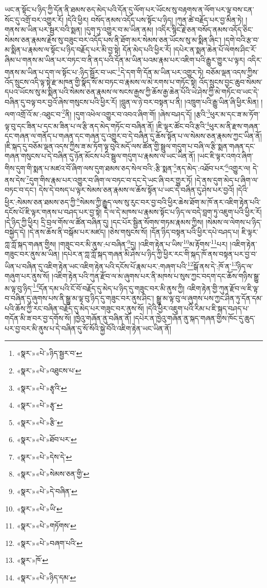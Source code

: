 ཡང་ན་སྟོང་པ་ཉིད་ཀྱི་དོན་ནི་ཐམས་ཅད་མེད་པའི་དོན་དུ་ལོག་པར་ཡོངས་སུ་བརྟགས་ན་ལོག་པར་ལྟ་བས་ངན་སོང་དུ་འགྲོ་བར་འགྱུར་རོ། །དེའི་ཕྱིར། བསོད་ནམས་འདོད་པས་སྟོང་པ་ཉིད། །ཀུན་ཚེ་བརྗོད་པར་བྱ་མིན་ཏེ། །གནས་མ་ཡིན་པར་སྦྱར་བའི་སྨན། །དུག་ཏུ་འགྱུར་བ་མ་ཡིན་ནམ། །འདིར་སྙིང་རྗེ་ཅན་བསོད་ནམས་འདོད་ཅིང་སེམས་ཅན་རྣམས་རྗེས་སུ་བཟུང་བར་འདོད་པས་ནི་ཐོག་མར་སེམས་ཅན་ཡོངས་སུ་མ་སྨིན་ཞིང་། །དགེ་བའི་རྩ་བ་མ་སྨིན་པ་རྣམས་ལ་སྟོང་པ་ཉིད་བརྗོད་པར་མི་བྱ་སྟེ། དོན་མེད་པའི་ཕྱིར་རོ། །དཔེར་ན་སྨན་ཆེན་པོ་ལེགས་ཤིང་རོ་ཞིམ་པ་གནས་མ་ཡིན་པར་བཏང་བ་ནི་ནད་པའི་དོན་མ་ཡིན་པའམ་རྣམ་པར་འཇིག་པའི་རྒྱུར་གྱུར་པ་ལྟར། འདིར་གནས་མ་ཡིན་པ་དག་ལ་སྟོང་པ་:ཉིད་སྦྱོར་བ་ཡང་\footnote{«སྣར་»«པེ་»ཉིད་སྦྱར་བ་}དེ་དག་གི་དོན་མ་ཡིན་པར་འགྱུར་ཏེ། བཅོམ་ལྡན་འདས་ཀྱིས་འོད་སྲུངས་འདི་ལྟ་སྟེ་རྫ་མཁན་གྱི་སྣོད་སོ་མ་བཏང་བ་རྣམས་ལ་མེ་རགས་པ་གཏོང་སྟེ། འོད་སྲུངས་བྱང་ཆུབ་སེམས་དཔའ་ཡོངས་སུ་མ་སྨིན་པའི་སེམས་ཅན་རྣམས་ལ་སངས་རྒྱས་ཀྱི་ཆོས་རྒྱ་ཆེན་པོའི་ཡེ་ཤེས་ཀྱི་མེ་གཏོང་བ་ཡང་དེ་བཞིན་དུ་བལྟ་བར་བྱའོ་ཞེས་གསུངས་པའི་ཕྱིར་རོ། །བླུན་ལ་ཉེ་བར་བསྟན་པ་ནི། །འཁྲུག་པའི་རྒྱུ་ཡིན་ཞི་ཕྱིར་མིན། །ལག་འགྲོ་འོ་མ་:འཐུང་བ་\footnote{«སྣར་»«པེ་»འཐུངས་པ་}ནི། །དུག་འཕེལ་འགྱུར་བ་འབའ་ཞིག་གོ། །ཞེས་བཤད་དོ། །རྩའི་\footnote{«སྣར་»«པེ་»རྩྭའི་}ཕུར་མ་དང་ཟ་མ་ཏོག་ལྟ་བུ་དང་ཟིན་པ་དང་མ་ཟིན་པ་ལ་རྩི་ནད་མེད་གཏོང་བ་བཞིན་ནོ། །ཇི་ལྟར་ཚོང་བའི་རྩའི་\footnote{«སྣར་»«པེ་»རྩྭ་}ཕུར་མ་ནི་རྫས་གཞན་དང་གཞན་ལ་གནོད་པ་གཞན་དང་གཞན་དུ་འགྱུར་བ་དེ་བཞིན་དུ་ཆོས་སྟོན་པ་ལ་སེམས་ཅན་རྣམས་ཀྱང་ཡིན་ནོ། །ཇི་སྐད་དུ་བཅོམ་ལྡན་འདས་ཀྱིས་ཟ་མ་ཏོག་ལྟ་བུའི་མདོ་ལས་ཚོན་གྱི་སྦྲུལ་གདུག་པ་བཞི་ལ་རྩི་སྨན་གཞན་དང་གཞན་གསུངས་པ་དེ་བཞིན་དུ་ཉོན་མོངས་པའི་སྦྲུལ་གདུག་པ་རྣམས་ལ་ཡང་ཡིན་ནོ། །ཡང་ཇི་ལྟར་འགའ་ཞིག་གིས་དུག་གི་སྨན་པ་མཛའ་བོ་ཞིག་ལས་དུག་ཐམས་ཅད་སེལ་བའི་:རྩི་སྨན་\footnote{«སྣར་»«པེ་»རྩི་}ནད་མེད་:འཐོབ་པར་\footnote{«སྣར་»«པེ་»ཐོབ་པར་}འགྱུར་ལ། དེ་ནས་དེས་\footnote{«སྣར་»«པེ་»དེས་དེ་}དུག་གིས་རྣམ་པར་འགྱུར་བ་ཞིག་ལ་བཏང་བ་དང་དེ་ཡང་ཞི་བར་གྱུར་ཏོ། །དེ་ནས་དུག་མེད་པ་ཞིག་ལ་བཏང་བ་དང་། དེས་དེ་བསད་པ་ལྟར་སེམས་ཅན་རྣམས་ལ་ཆོས་སྟོན་པ་ཡང་དེ་བཞིན་དུ་ཤེས་པར་བྱའོ། །དེའི་ཕྱིར་:སེམས་ཅན་ཐམས་ཅད་ཀྱི་\footnote{«སྣར་»«པེ་»སེམས་ཅན་གྱི་}སེམས་ཀྱི་རྒྱུད་ལས་སུ་རུང་བར་བྱ་བའི་ཕྱིར་ཆེས་ཐོག་མ་ཁོ་ནར་འཇིག་རྟེན་པའི་དངོས་པོ་ཇི་ལྟར་གནས་པ་བཤད་པར་བྱ་སྟེ། དེ་ལ་དེ་མཁས་པ་རྣམས་སྟོང་པ་ཉིད་ལ་བདེ་བླག་ཏུ་འཇུག་པའི་ཕྱིར་རོ། །དེ་ཉིད་ཀྱི་ཕྱིར། དྲི་བྲལ་གོས་ལ་ཚོན་བཞིན་དུ། །དང་པོར་སྦྱིན་སོགས་གཏམ་རྣམས་ཀྱིས། །སེམས་ལ་ལེགས་པ་ཉིད་བསྐྱེད་དེ། །དེ་ནས་ཆོས་ནི་བསྒོམ་པར་མཛད། །ཅེས་གསུངས་སོ། །དོན་ཉིད་བསྟན་པའི་ཕྱིར་དཔེ་བཤད་པ། ཇི་ལྟར་ཀླ་ཀློ་སྐད་གཞན་གྱིས། །གཟུང་བར་མི་ནུས་:པ་བཞིན་\footnote{«སྣར་»«པེ་»དེ་བཞིན་}དུ། །འཇིག་རྟེན་པ་ཡིས་\footnote{«སྣར་»«པེ་»ཡི་}མ་རྟོགས་\footnote{«སྣར་»«པེ་»གཏོགས་}པར། །འཇིག་རྟེན་གཟུང་བར་ནུས་མ་ཡིན། །དཔེར་ན་ཀླ་ཀློ་སྐད་གཞན་མི་ཤེས་པ་ཉིད་ཀྱི་ཕྱིར་རང་གི་སྐད་ཁོ་ནས་བསྟན་པར་བྱ་བ་ཡིན་པ་བཞིན་དུ་འཇིག་རྟེན་ཡང་འཇིག་རྟེན་པའི་དངོས་པོ་རྣམ་པར་:གཞག་པའི་\footnote{«སྣར་»«པེ་»བཞག་པའི་}སྒོ་ནས་དེ་:ཁོ་ན་\footnote{«སྣར་»ཁོ་}ཉིད་ལ་གཞུག་པར་ནུས་སོ། །འཇིག་རྟེན་པའི་ཀུན་རྫོབ་ལ་མ་ཞུགས་པར་ནི་མཁས་པ་སུས་ཀྱང་བདག་དང་ཆོས་གཉིས་སྒྱུ་མ་ལྟ་བུ་ཉིད་\footnote{«སྣར་»«པེ་»ཉིད་དམ་}དོན་དམ་པའི་ངོ་བོ་བརྗོད་དུ་མེད་པ་ཉིད་དུ་གཟུང་བར་མི་ནུས་ཀྱི། འཇིག་རྟེན་གྱི་ཀུན་རྫོབ་ལ་ཇི་ལྟ་བ་བཞིན་དུ་ཞུགས་པས་ནི་སྒྱུ་མ་ལྟ་བུ་ཉིད་དུ་གཟུང་བར་ནུས་ཤིང་། སྒྱུ་མ་ལྟ་བུ་ལ་ཞུགས་པས་ཀྱང་ཤིན་ཏུ་དོན་དམ་པའི་ཆོས་ཀྱི་རང་བཞིན་བརྗོད་དུ་མེད་པར་གཟུང་བར་ནུས་སོ། །དེའི་ཕྱིར་འཇུག་པའི་རིམ་པ་ཇི་སྐད་བཤད་པ་གདོན་མི་ཟ་བར་བྱ་དགོས་སོ། །ཁྱེའུ་གཞོན་ནུ་བཞིན་ནོ། །དཔེར་ན་ཁྱེའུ་གཞོན་ནུ་སྐད་གཞན་གྱིས་ཁོང་དུ་ཆུད་པར་བྱ་བར་མི་ནུས་པ་དེ་བཞིན་དུ་སོ་སོའི་སྐྱེ་བོའི་འཇིག་རྟེན་ཡང་ཡིན་ནོ། 